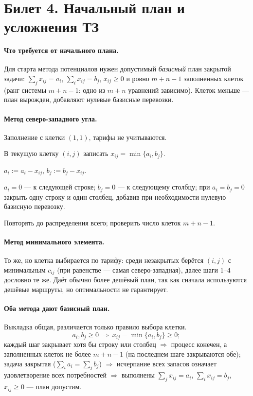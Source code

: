 \section{Билет 4. Начальный план и усложнения ТЗ}


\paragraph{Что требуется от начального плана.}
Для старта метода потенциалов нужен допустимый \emph{базисный} план закрытой
задачи: $\sum_j x_{ij} = a_i$, $\sum_i x_{ij} = b_j$, $x_{ij} \ge 0$ и ровно
$m+n-1$ заполненных клеток (ранг системы $m+n-1$: одно из $m+n$ уравнений
зависимо). Клеток меньше — план вырожден, добавляют нулевые базисные перевозки.

\paragraph{Метод северо-западного угла.}
Заполнение с клетки $(1,1)$, тарифы не учитываются.
\begin{csteps}
  \item В текущую клетку $(i,j)$ записать $x_{ij} = \min\{a_i, b_j\}$.
  \item $a_i := a_i - x_{ij}$, $b_j := b_j - x_{ij}$.
  \item $a_i = 0$ — к следующей строке; $b_j = 0$ — к следующему столбцу; при
        $a_i = b_j = 0$ закрыть одну строку и один столбец, добавив при
        необходимости нулевую базисную перевозку.
  \item Повторять до распределения всего; проверить число клеток $m+n-1$.
\end{csteps}

\paragraph{Метод минимального элемента.}
То же, но клетка выбирается по тарифу: среди незакрытых берётся $(i,j)$ с
минимальным $c_{ij}$ (при равенстве — самая северо-западная), далее шаги 1--4
дословно те же. Даёт обычно более дешёвый план, так как сначала используются
дешёвые маршруты, но оптимальности не гарантирует.

\paragraph{Оба метода дают базисный план.}
Выкладка общая, различается только правило выбора клетки.
\[
  a_i, b_j \ge 0 \ \Rightarrow\ x_{ij} = \min\{a_i, b_j\} \ge 0 ;
\]
каждый шаг закрывает хотя бы строку или столбец $\Rightarrow$ процесс конечен,
а заполненных клеток не более $m+n-1$ (на последнем шаге закрываются обе);
задача закрытая ($\sum_i a_i = \sum_j b_j$) $\Rightarrow$ исчерпание всех
запасов означает удовлетворение всех потребностей $\Rightarrow$ выполнены
$\sum_j x_{ij} = a_i$, $\sum_i x_{ij} = b_j$, $x_{ij} \ge 0$ — план допустим.

